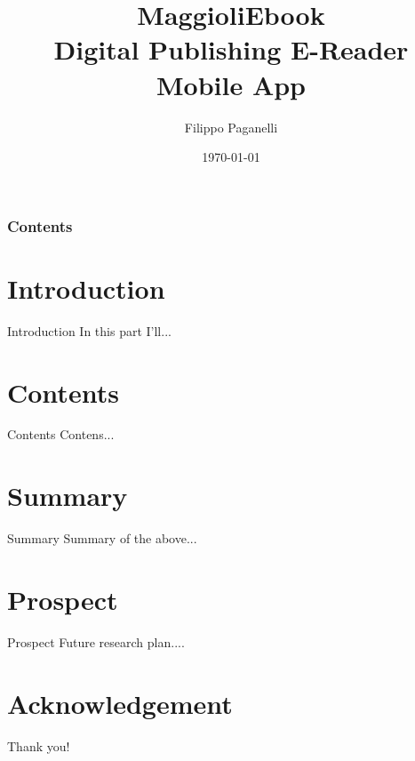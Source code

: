 \documentclass[10pt]{beamer}
\title[Alma Mater Studiorum - Università di Bologna]{MaggioliEbook \\ Digital Publishing E-Reader Mobile App}%
\author[Filippo Paganelli]{Filippo Paganelli \\ }%
\institute[0000926989]{Alma Mater Studiorum \\ Università di Bologna \\ Campus di Cesena}
\date[\textcolor{white}{\today} ]
{\today}
\begin{document}
\frame{\titlepage}
\begin{frame}
\frametitle{Contents}
\tableofcontents
\end{frame}
\section{Introduction}
    \begin{frame}{Introduction}
 In this part I'll...
    \end{frame}

\section{Contents}
\begin{frame}{Contents}
	Contens...
\end{frame}



\section{Summary}
    \begin{frame}{Summary}
 Summary of the above...
    \end{frame}


\section{Prospect}
\begin{frame}{Prospect}
	Future research plan.... 
\end{frame}

\section*{Acknowledgement}  
\begin{frame}
\textcolor{myNewColorA}{\Huge{\centerline{Thank you!}}}
\end{frame}
\end{document}
